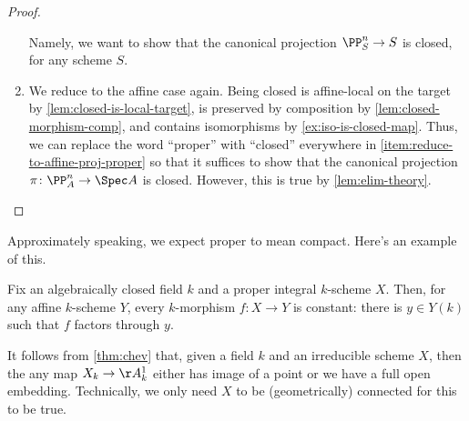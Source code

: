 \documentclass[../notes.tex]{subfiles}
\begin{document}
\begin{proof}
\begin{enumerate}
		Namely, we want to show that the canonical projection $\PP^n_S\to S$ is closed, for any scheme $S$.

		\item We reduce to the affine case again. Being closed is affine-local on the target by \autoref{lem:closed-is-local-target}, is preserved by composition by \autoref{lem:closed-morphism-comp}, and contains isomorphisms by \autoref{ex:iso-is-closed-map}. Thus, we can replace the word ``proper'' with ``closed'' everywhere in \autoref{item:reduce-to-affine-proj-proper} so that it suffices to show that the canonical projection $\pi\colon\PP^n_A\to\Spec A$ is closed. However, this is true by \autoref{lem:elim-theory}.
		\qedhere
	\end{enumerate}
\end{proof}
Approximately speaking, we expect proper to mean compact. Here's an example of this.
\begin{proposition}
	Fix an algebraically closed field $k$ and a proper integral $k$-scheme $X$. Then, for any affine $k$-scheme $Y$, every $k$-morphism $f\colon X\to Y$ is constant: there is $y\in Y(k)$ such that $f$ factors through $y$.
\end{proposition}
\begin{remark}
	It follows from \autoref{thm:chev} that, given a field $k$ and an irreducible scheme $X$, then the any map $X_k\to\AA^1_k$ either has image of a point or we have a full open embedding. Technically, we only need $X$ to be (geometrically) connected for this to be true.
\end{remark}
\end{document}
